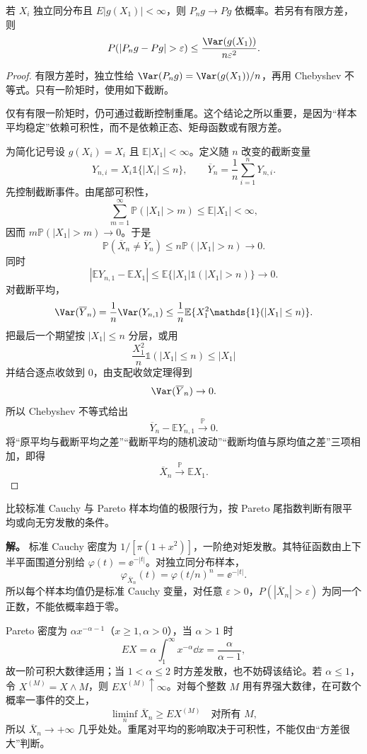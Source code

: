\begin{theorem}
若 $X_i$ 独立同分布且 $E|g(X_1)|<\infty$，则 $P_ng\to Pg$ 依概率。若另有有限方差，则
\[
 P(|P_ng-Pg|>\varepsilon)\le\frac{\Var(g(X_1))}{n\varepsilon^2}.
\]
\end{theorem}
\begin{proof}
有限方差时，独立性给 $\Var(P_ng)=\Var(g(X_1))/n$，再用 Chebyshev 不等式。只有一阶矩时，使用如下截断。

仅有有限一阶矩时，仍可通过截断控制重尾。这个结论之所以重要，是因为“样本平均稳定”依赖可积性，而不是依赖正态、矩母函数或有限方差。

为简化记号设 $g(X_i)=X_i$ 且 $\mathbb E|X_1|<\infty$。定义随 $n$ 改变的截断变量
\[
 Y_{n,i}=X_i\mathds{1}\{|X_i|\le n\},
 \qquad
 \overline Y_n=\frac1n\sum_{i=1}^nY_{n,i}.
\]
先控制截断事件。由尾部可积性，
\[
 \sum_{m=1}^\infty \mathbb P(|X_1|>m)
 \le \mathbb E|X_1|<\infty,
\]
因而 $m\mathbb P(|X_1|>m)\to0$。于是
\[
 \mathbb P(\overline X_n\ne\overline Y_n)
 \le n\mathbb P(|X_1|>n)\to0.
\]
同时
\[
 |\mathbb E Y_{n,1}-\mathbb E X_1|
 \le\mathbb E\{|X_1|\mathds{1}(|X_1|>n)\}\to0.
\]
对截断平均，
\[
 \Var(\overline Y_n)
 =\frac1n\Var(Y_{n,1})
 \le\frac1n\mathbb E\{X_1^2\mathds{1}(|X_1|\le n)\}.
\]
把最后一个期望按 $|X_1|\le n$ 分层，或用
\[
 \frac{X_1^2}{n}\mathds{1}(|X_1|\le n)
 \le |X_1|
\]
并结合逐点收敛到 $0$，由支配收敛定理得到
\[
 \Var(\overline Y_n)\to0.
\]
所以 Chebyshev 不等式给出
\[
 \overline Y_n-\mathbb E Y_{n,1}\xrightarrow{\mathbb P}0.
\]
将“原平均与截断平均之差”“截断平均的随机波动”“截断均值与原均值之差”三项相加，即得
\[
 \overline X_n\xrightarrow{\mathbb P}\mathbb E X_1.
\]

\end{proof}

\begin{exbox}[重尾样本平均的两种行为]
比较标准 Cauchy 与 Pareto 样本均值的极限行为，按 Pareto 尾指数判断有限平均或向无穷发散的条件。

\textbf{解。} 标准 Cauchy 密度为 $1/[\pi(1+x^2)]$，一阶绝对矩发散。其特征函数由上下半平面围道分别给 $\varphi(t)=\ee^{-|t|}$。对独立同分布样本，
\[
 \varphi_{\overline X_n}(t)=\varphi(t/n)^n=\ee^{-|t|}.
\]
所以每个样本均值仍是标准 Cauchy 变量，对任意 $\varepsilon>0$，$P(|\overline X_n|>\varepsilon)$ 为同一个正数，不能依概率趋于零。

Pareto 密度为 $\alpha x^{-\alpha-1}$（$x\ge1,\alpha>0$），当 $\alpha>1$ 时
\[
 EX=\alpha\int_1^\infty x^{-\alpha}\dd x=\frac\alpha{\alpha-1},
\]
故一阶可积大数律适用；当 $1<\alpha\le2$ 时方差发散，也不妨碍该结论。若 $\alpha\le1$，令 $X^{(M)}=X\wedge M$，则 $EX^{(M)}\uparrow\infty$。对每个整数 $M$ 用有界强大数律，在可数个概率一事件的交上，
\[
 \liminf_n\overline X_n\ge EX^{(M)}\quad\text{对所有 }M,
\]
所以 $\overline X_n\to+\infty$ 几乎处处。重尾对平均的影响取决于可积性，不能仅由“方差很大”判断。
\end{exbox}

